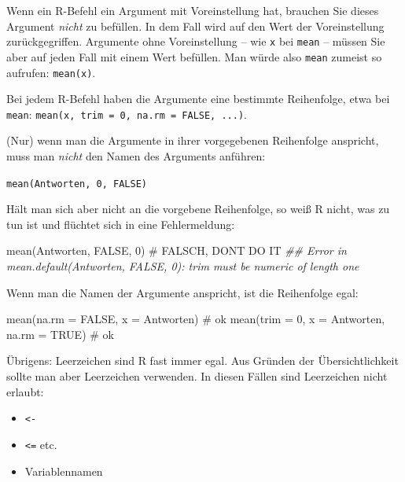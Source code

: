 \documentclass[
  letterpaper,
  oneside,
  open=any]{scrbook}
\newenvironment{Shaded}{\begin{snugshade}}{\end{snugshade}}
\newcommand{\AttributeTok}[1]{\textcolor[rgb]{0.40,0.45,0.13}{#1}}
\newcommand{\CommentTok}[1]{\textcolor[rgb]{0.37,0.37,0.37}{#1}}
\newcommand{\ConstantTok}[1]{\textcolor[rgb]{0.56,0.35,0.01}{#1}}
\newcommand{\DecValTok}[1]{\textcolor[rgb]{0.68,0.00,0.00}{#1}}
\newcommand{\DocumentationTok}[1]{\textcolor[rgb]{0.37,0.37,0.37}{\textit{#1}}}
\newcommand{\FunctionTok}[1]{\textcolor[rgb]{0.28,0.35,0.67}{#1}}
\newcommand{\NormalTok}[1]{\textcolor[rgb]{0.00,0.23,0.31}{#1}}
\providecommand{\tightlist}{%
  \setlength{\itemsep}{0pt}\setlength{\parskip}{0pt}}\usepackage{longtable,booktabs,array}
\theoremstyle{definition}
\theoremstyle{definition}
\theoremstyle{definition}
\theoremstyle{remark}
\begin{document}
Wenn ein R-Befehl ein Argument mit Voreinstellung hat, brauchen Sie
dieses Argument \emph{nicht} zu befüllen. In dem Fall wird auf den Wert
der Voreinstellung zurückgegriffen. Argumente ohne Voreinstellung -- wie
\texttt{x} bei \texttt{mean} -- müssen Sie aber auf jeden Fall mit einem
Wert befüllen. Man würde also \texttt{mean} zumeist so aufrufen:
\texttt{mean(x)}.

Bei jedem R-Befehl haben die Argumente eine bestimmte Reihenfolge, etwa
bei \texttt{mean}:
\texttt{mean(x,\ trim\ =\ 0,\ na.rm\ =\ FALSE,\ ...)}.

(Nur) wenn man die Argumente in ihrer vorgegebenen Reihenfolge
anspricht, muss man \emph{nicht} den Namen des Arguments anführen:

 \texttt{mean(Antworten,\ 0,\ FALSE)}

Hält man sich aber nicht an die vorgebene Reihenfolge, so weiß R nicht,
was zu tun ist und flüchtet sich in eine Fehlermeldung:

\begin{Shaded}
\begin{Highlighting}[]
\FunctionTok{mean}\NormalTok{(Antworten, }\ConstantTok{FALSE}\NormalTok{, }\DecValTok{0}\NormalTok{)  }\CommentTok{\# FALSCH, DON\textquotesingle{}T DO IT }
\DocumentationTok{\#\# Error in mean.default(Antworten, FALSE, 0): \textquotesingle{}trim\textquotesingle{} must be numeric of length one}
\end{Highlighting}
\end{Shaded}

Wenn man die Namen der Argumente anspricht, ist die Reihenfolge egal:

\begin{Shaded}
\begin{Highlighting}[]
\FunctionTok{mean}\NormalTok{(}\AttributeTok{na.rm =} \ConstantTok{FALSE}\NormalTok{, }\AttributeTok{x =}\NormalTok{ Antworten)  }\CommentTok{\# ok}
\FunctionTok{mean}\NormalTok{(}\AttributeTok{trim =} \DecValTok{0}\NormalTok{, }\AttributeTok{x =}\NormalTok{ Antworten, }\AttributeTok{na.rm =} \ConstantTok{TRUE}\NormalTok{)  }\CommentTok{\# ok}
\end{Highlighting}
\end{Shaded}

Übrigens: Leerzeichen sind R fast immer egal. Aus Gründen der
Übersichtlichkeit sollte man aber Leerzeichen verwenden. In diesen
Fällen sind Leerzeichen nicht erlaubt:

\begin{itemize}
\tightlist
\item
  \texttt{\textless{}-}
\item
  \texttt{\textless{}=} etc.
\item
  Variablennamen
\end{itemize}
\end{document}
